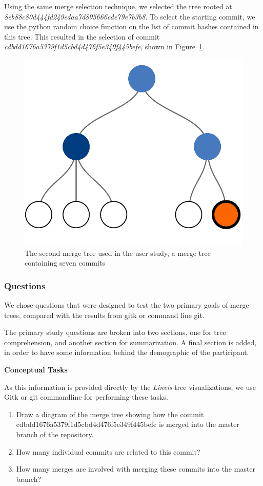 Using the same merge selection technique, we selected the tree rooted at
\emph{8eb88c80d444fd249edaa7d895666cde79e7b3b8}. To select the starting
commit, we use the python random choice function on the list of commit
hashes contained in this tree. This resulted in the selection of commit
\emph{cdbdd1676a5379f1d5cbd4d476f5e349f445befe}, shown in
Figure~\ref{fig:commit_2}.

\begin{figure}[htpb]
  \centering
  \includegraphics[width=0.5\linewidth]{figures/commits/7-commits.pdf}
  \caption{The second merge tree used in the user study, a merge tree
    containing seven commits}
  \label{fig:commit_2}
\end{figure}

\subsubsection{Questions}
\label{ssub:questions}

We chose questions that were designed to test the two primary goals of
merge trees, compared with the results from gitk or command line git.

The primary study questions are broken into two sections, one for
tree comprehension, and another section for summarization. A final
section is added, in order to have some information behind the
demographic of the participant.

\textbf{Conceptual Tasks}

As this information is provided directly by the \emph{Linvis} tree
visualizations, we use Gitk or git commandline for performing these
tasks.

\begin{enumerate}
  \item Draw a diagram of the merge tree showing how the commit
    cdbdd1676a5379f1d5cbd4d476f5e349f445befe is merged into the master
    branch of the repository.
  \item How many individual commits are related to this commit?
  \item How many merges are involved with merging these commits into the
    master branch?
\end{enumerate}

